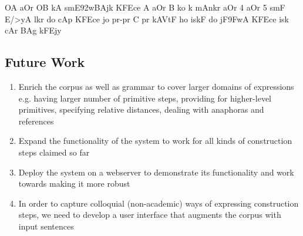 \def\DevnagVersion{2.15}\documentclass[12pt]{article}
\begin{document}
OA {\dn aOr} OB {\dn kA smE\392wBAjk KF{\qva}Ece}
A {\dn aOr} B {\dn ko k\?{\qva} mAnkr aOr} 4 {\dn aOr} 5 {\dn s\?mF E/>yA l\?kr do cAp KF{\qva}Ece jo pr-pr} C {\dn pr kAVtF ho}
{\dn iskF do jF\39FwA KF{\qva}Ece}
{\dn isk\? cAr BAg kFEjy\?}

\subsection{Future Work}
\begin{enumerate}
\item Enrich the corpus as well as grammar to cover larger domains of expressions e.g. having larger number of primitive steps, providing for higher-level primitives, specifying relative distances, dealing with anaphoras and references
\item Expand the functionality of the system to work for all kinds of construction steps claimed so far
\item Deploy the system on a webserver to demonstrate its functionality and work towards making it more robust
\item In order to capture colloquial (non-academic) ways of expressing construction steps, we need to develop a user interface that augments the corpus with input sentences
\end{enumerate}

\nocite{schreck2012geometric}
\nocite{gulwani2011synthesizing}
\nocite{ahmed2012can}
\nocite{itzhaky2012solving}
\nocite{zettlemoyer2012learning}
\nocite{och2003systematic}
\nocite{root-RL-86-phd-ut_semantics-of-anaphora-in-discourse}
\nocite{kamp2011discourse}
\nocite{jurafsky2000speech}
\nocite{mitkov2002anaphora}

\renewcommand\refname{Annotated References}
{}

\end{document}
